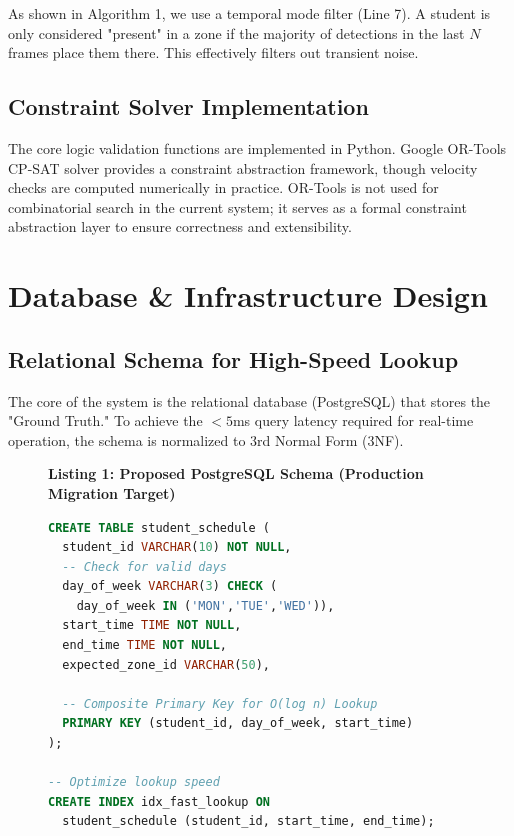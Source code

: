 \documentclass[conference]{IEEEtran}
\begin{document}
\begin{center}
\end{center}

As shown in Algorithm 1, we use a temporal mode filter (Line 7). A student is only considered "present" in a zone if the majority of detections in the last $N$ frames place them there. This effectively filters out transient noise.

\subsection{Constraint Solver Implementation}
The core logic validation functions are implemented in Python. Google OR-Tools CP-SAT solver \cite{b19} provides a constraint abstraction framework, though velocity checks are computed numerically in practice. OR-Tools is not used for combinatorial search in the current system; it serves as a formal constraint abstraction layer to ensure correctness and extensibility.

\section{Database \& Infrastructure Design}

\subsection{Relational Schema for High-Speed Lookup}
The core of the system is the relational database (PostgreSQL) that stores the "Ground Truth." To achieve the $<5$ms query latency required for real-time operation, the schema is normalized to 3rd Normal Form (3NF). 

\begin{figure}[H]
\centering
\textbf{Listing 1: Proposed PostgreSQL Schema (Production Migration Target)}
\begin{lstlisting}[language=SQL]
CREATE TABLE student_schedule (
  student_id VARCHAR(10) NOT NULL,
  -- Check for valid days
  day_of_week VARCHAR(3) CHECK (
    day_of_week IN ('MON','TUE','WED')),
  start_time TIME NOT NULL,
  end_time TIME NOT NULL,
  expected_zone_id VARCHAR(50),
    
  -- Composite Primary Key for O(log n) Lookup
  PRIMARY KEY (student_id, day_of_week, start_time)
);

-- Optimize lookup speed
CREATE INDEX idx_fast_lookup ON 
  student_schedule (student_id, start_time, end_time);
\end{lstlisting}
\label{code:sql}
\end{figure}
\end{document}
